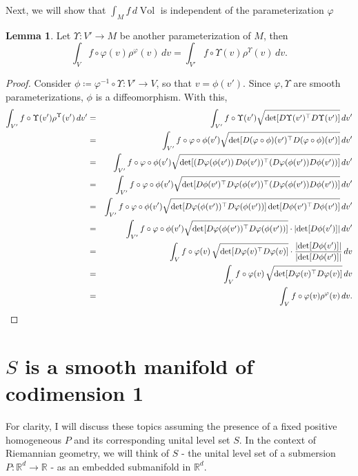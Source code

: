 \documentclass{article}
\theoremstyle{definition}
\renewcommand\det{\operatorname{det}}
\newcommand{\R}{\mathbb{R}}
\newcommand{\f}[2]{\frac{#1}{#2}}
\theoremstyle{theorem}
\newtheorem{lemma}[theorem]{Lemma}
\newcommand{\Vol}{\operatorname{Vol}}
\begin{document}
Next, we will show that $\int_M f\,d\Vol$ is independent of the parameterization $\varphi$

\begin{lemma}
Let $\Upsilon: V' \to M$ be another parameterization of $M$, then 
\begin{equation*}
    \int_{V} f\circ \varphi(v) \rho^\varphi(v)\,dv = \int_{V'} f\circ \Upsilon(v) \rho^{\Upsilon}(v)\,dv.
\end{equation*}
\end{lemma}


\begin{proof}
Consider $\phi \coloneqq \varphi^{-1}\circ \Upsilon : V'\to V$, so that $v = \phi(v')$. Since $\varphi, \Upsilon$ are smooth parameterizations, $\phi$ is a diffeomorphism. With this, 
\begin{eqnarray*}
    \int_{V'}f\circ \Upsilon(v') \rho^{\Upsilon}(v')\,dv' 
    &=& \int_{V'}f\circ \Upsilon(v') \sqrt{\det [ D \Upsilon (v') ^\top D \Upsilon(v') ]}\,dv' \\
    &=& \int_{V'}f\circ \varphi \circ \phi (v') \sqrt{\det [ D (\varphi \circ \phi) (v')^\top D (\varphi \circ \phi) (v') ]}\,dv' \\
    &=& \int_{V'}f\circ \varphi \circ \phi (v') \sqrt{\det[ (D\varphi(\phi(v'))\,D \phi (v'))^\top  (D\varphi(\phi(v'))D \phi (v')) ] }\,dv' \\
    &=& \int_{V'}f\circ \varphi \circ \phi (v') \sqrt{\det[ D\phi(v')^\top D\varphi(\phi(v'))^\top (D\varphi(\phi(v')) D \phi (v'))  ]}\,dv' \\
    &=& \int_{V'}f\circ \varphi \circ \phi (v') \sqrt{\det[  D\varphi(\phi(v'))^\top D\varphi(\phi(v'))  ]\det[D \phi(v')^\top D \phi(v')]}\,dv' \\
    &=& \int_{V'}f\circ \varphi \circ \phi (v') \sqrt{\det[  D\varphi(\phi(v'))^\top D\varphi(\phi(v'))  ]}\cdot   \abs{\det[D\phi(v')]}\,dv' \\
    &=& \int_V f\circ \varphi(v)\,\sqrt{\det[D \varphi(v)^\top D \varphi(v)]} \cdot \f{\abs{\det[D\phi(v')]}}{\abs{\det[D\phi(v')]}} \,dv \\ 
    &=& \int_V f\circ \varphi(v)\,\sqrt{\det[D \varphi(v)^\top D \varphi(v)]} \,dv\\
    &=& \int_{V} f\circ \varphi(v) \rho^\varphi(v)\,dv.
\end{eqnarray*}
\end{proof}



\section{$S$ is a smooth manifold of codimension 1}
For clarity, I will discuss these topics assuming the presence of a fixed positive homogeneous $P$ and its corresponding unital level set $S$. In the context of Riemannian geometry, we will think of $S$ - the unital level set of a submersion $P: \R^d \to \R$ - as an embedded submanifold in $\R^d$. \\
\end{document}
